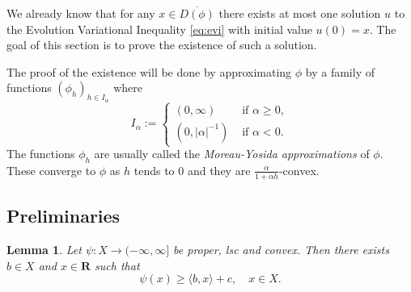 \documentclass[a4paper,11pt, leqno]{scrreprt} %
\renewcommand{\geq}{\geqslant}
\newcommand{\R}{\mathbf R}
\theoremstyle{change}
\newcounter{acounter}[chapter]
\newtheorem{lemma}[acounter]{Lemma}
\theoremstyle{nonumberplain}
\begin{document}
We already know that for any $x \in \overline{D(\phi)}$ there exists
at most one solution $u$ to the Evolution Variational Inequality
\eqref{eq:evi} with initial value $u(0) = x$. The goal of this section
is to prove the existence of such a solution.

The proof of the existence will be done by approximating $\phi$ by a
family of functions $(\phi_h)_{h \in I_\alpha}$ where 
\begin{equation}
I_\alpha:=
\begin{cases}
(0, \infty) & \text{ if $\alpha \geq 0$},\\
(0, |\alpha|^{-1}) & \text{ if $\alpha < 0$}.
\end{cases}
\end{equation}
The functions $\phi_h$ are usually called the \textit{Moreau-Yosida
  approximations} of $\phi$. These converge to $\phi$ as $h$ tends to
$0$ and they are $\frac{\alpha}{1 + \alpha h}$-convex.

\subsection{Preliminaries}
\begin{lemma}\label{lem:prelim1}
Let $\psi: X \to (-\infty, \infty]$ be proper, lsc and convex. Then
there exists $b \in X$ and $x \in \R$ such that
\begin{equation}\label{eq:lemmapre11}
\psi(x) \geq \langle b, x \rangle + c, \quad x \in X.
\end{equation}
\end{lemma}
\end{document}
